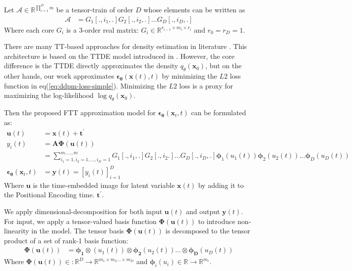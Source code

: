 \documentclass[11pt]{article}
\begin{document}
    Let $\bm{\mathscr{A}} \in \mathbb{R}^{\prod_{i=1}^{D}m}$ be a tensor-train of order $D$ whose elements can be written as
    \begin{equation}
        \label{eq:tt}
        \begin{aligned}
            \bm{\mathscr{A}} &= G_1[.,i_1,.]G_2[.,i_2,.]\dots G_D[.,i_D,.]
        \end{aligned}
    \end{equation}
    Where each core $G_i$ is a 3-order real matrix: $G_i \in \mathbb{R}^{r_{i-1}\times m_i \times r_{i}}$ and $r_0=r_D=1$.

    There are many TT-based approaches for density estimation in literature \cite{han2024tensor,novikov2022tensortrain}.
    This architecture is based on the TTDE model introduced in \cite{novikov2022tensortrain}.
    However, the core difference is the TTDE directly approximates the density $q_{\theta}(\mathbf{x}_0)$, but on the other hands,
    our work approximates $\bm{\epsilon}_{\bm{\theta}}(\mathbf{x}(t),t)$ by minimizing the $L2$ loss function in
    eq(\ref{eq:ddpm-loss-simple}). Minimizing the $L2$ loss is a proxy for maximizing the log-likelihood
    $\log q_{\theta}(\mathbf{x}_0)$.

    Then the proposed FTT approximation model for $\boldsymbol{\epsilon}_{\bm{\theta}}\left(\mathbf{x}_t, t\right)$ can be formulated as:
    \begin{subequations}
        \begin{align}
            \mathbf{u}(t)&= \mathbf{x}(t) + \mathbf{t}^{\prime} \\
            y_{i}(t) &= \mathbf{A}\bm{\Phi}(\mathbf{u}(t)) \\
            &= \sum_{i_1=1,i_2=1,\dots,i_D=1}^{m,\dots,m} G_1[.,i_1,.]G_2[.,i_2.] \dots G_D[.,i_D,.]\bm{\phi}_1(u_1(t))\bm{\phi}_2(u_2(t))...\bm{\phi}_D(u_D(t))\\
            \boldsymbol{\epsilon}_{\bm{\theta}}\left(\mathbf{x}_t, t\right) &= \mathbf{y}(t)=[y_i(t)]_{i=1}^{D}
        \end{align}
        \label{eq:ftt-ddpm-noise-model}
    \end{subequations}
    Where $\mathbf{u}$ is the time-embedded image for latent variable $\mathbf{x}(t)$ by adding it to the Positional Encoding time.
    $\mathbf{t}^{\prime}$.


    We apply dimensional-decomposition for both input $\mathbf{u}(t)$ and output $\mathbf{y}(t)$.
    For input, we apply a tensor-valued basis function $\bm{\Phi}(\mathbf{u}(t))$ to introduce non-linearity in the model.
    The tensor basis $\bm{\Phi}(\mathbf{u}(t))$ is decomposed to the tensor product of a set of rank-1 basis function:
    \begin{align*}
        \bm{\Phi}(\mathbf{u}(t)) &= \bm{\phi_1}\otimes(u_1(t)) \otimes \bm{\phi_2}(u_2(t)) \dots \otimes \bm{\phi_D}(u_D(t))
    \end{align*}
    Where $\bm{\Phi}(\mathbf{u}(t)) \in : \mathbb{R}^{D} \rightarrow \mathbb{R}^{m_1 \times m_2 \dots \times m_D}$
    and $\bm{\phi}_i(u_i) \in \mathbb{R} \rightarrow \mathbb{R}^{m_i}$.
\end{document}
